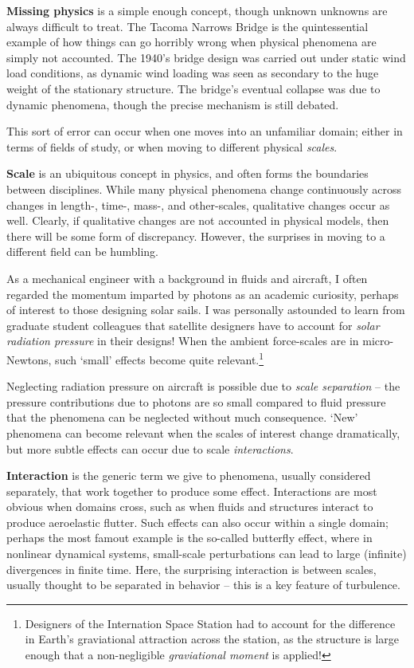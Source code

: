\documentclass[../primer.tex]{subfiles}
\begin{document}
\textbf{Missing physics} is a simple enough concept, though unknown unknowns are
always difficult to treat. The Tacoma Narrows Bridge is the quintessential
example of how things can go horribly wrong when physical phenomena are simply
not accounted. The 1940's bridge design was carried out under static wind load
conditions, as dynamic wind loading was seen as secondary to the huge weight of
the stationary structure.\cite{scott2003} The bridge's eventual collapse was due
to dynamic phenomena, though the precise mechanism is still
debated.\cite{billah1991resonance}

This sort of error can occur when one moves into an unfamiliar domain; either in
terms of fields of study, or when moving to different physical \emph{scales}.

\textbf{Scale} is an ubiquitous concept in physics, and often forms the
boundaries between disciplines. While many physical phenomena change
continuously across changes in length-, time-, mass-, and other-scales,
qualitative changes occur as well. Clearly, if qualitative changes are not
accounted in physical models, then there will be some form of discrepancy.
However, the surprises in moving to a different field can be humbling.

As a mechanical engineer with a background in fluids and aircraft, I often
regarded the momentum imparted by photons as an academic curiosity, perhaps of
interest to those designing solar sails. I was personally astounded to learn
from graduate student colleagues that satellite designers have to account for
\emph{solar radiation pressure} in their designs! When the ambient force-scales
are in micro-Newtons, such `small' effects become quite
relevant.\footnote{Designers of the Internation Space Station had to account for
  the difference in Earth's graviational attraction across the station, as the
  structure is large enough that a non-negligible \emph{graviational moment} is
  applied!}

Neglecting radiation pressure on aircraft is possible due to \emph{scale
  separation} -- the pressure contributions due to photons are so small compared
to fluid pressure that the phenomena can be neglected without much consequence.
`New' phenomena can become relevant when the scales of interest change
dramatically, but more subtle effects can occur due to scale
\emph{interactions}.

\textbf{Interaction} is the generic term we give to phenomena, usually
considered separately, that work together to produce some effect. Interactions
are most obvious when domains cross, such as when fluids and structures interact
to produce aeroelastic flutter. Such effects can also occur within a single
domain; perhaps the most famout example is the so-called butterfly effect, where
in nonlinear dynamical systems, small-scale perturbations can lead to large
(infinite) divergences in finite time. Here, the surprising interaction is
between scales, usually thought to be separated in behavior -- this is a key
feature of turbulence.\cite{pope2001turbulent}
\end{document}
